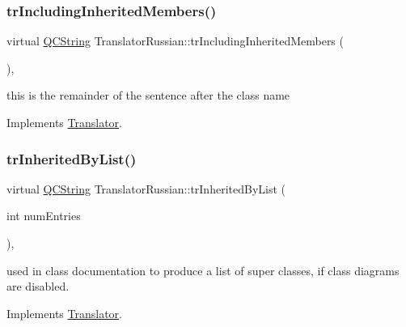 \mbox{\label{class_translator_russian_a245e20faae3a624460e7eaf99fd831fe}} 
\subsubsection{\texorpdfstring{trIncludingInheritedMembers()}{trIncludingInheritedMembers()}}
{\footnotesize\ttfamily virtual \mbox{\hyperlink{class_q_c_string}{Q\+C\+String}} Translator\+Russian\+::tr\+Including\+Inherited\+Members (\begin{DoxyParamCaption}{ }\end{DoxyParamCaption})\hspace{0.3cm}{\ttfamily [inline]}, {\ttfamily [virtual]}}

this is the remainder of the sentence after the class name 

Implements \mbox{\hyperlink{class_translator}{Translator}}.

\mbox{\label{class_translator_russian_a1dc5ea17e480345d83bf1f73b276d9e7}} 
\subsubsection{\texorpdfstring{trInheritedByList()}{trInheritedByList()}}
{\footnotesize\ttfamily virtual \mbox{\hyperlink{class_q_c_string}{Q\+C\+String}} Translator\+Russian\+::tr\+Inherited\+By\+List (\begin{DoxyParamCaption}\item[{int}]{num\+Entries }\end{DoxyParamCaption})\hspace{0.3cm}{\ttfamily [inline]}, {\ttfamily [virtual]}}

used in class documentation to produce a list of super classes, if class diagrams are disabled. 

Implements \mbox{\hyperlink{class_translator}{Translator}}.

\mbox{\label{class_translator_russian_a8ef9ed015f2fc934014498e7269e9aef}} 
